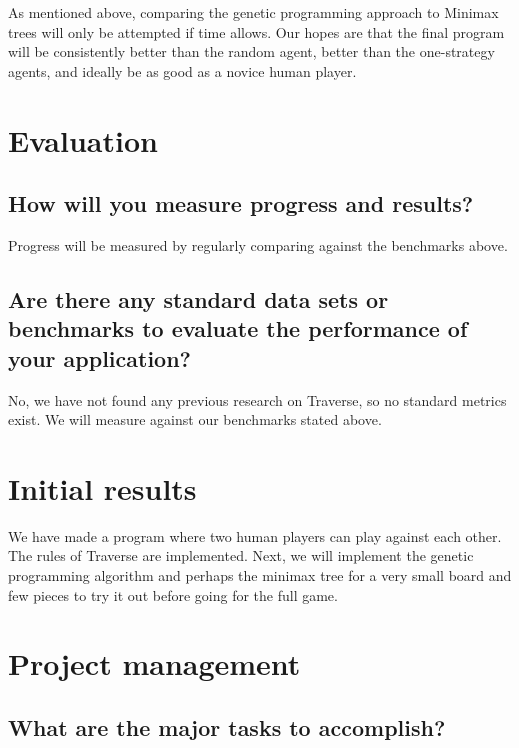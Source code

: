 \documentclass[times, 10pt,twocolumn]{article}
\begin{document}
As mentioned above, comparing the genetic programming approach to Minimax trees will only be attempted if time allows. Our hopes are that the final program will be consistently better than the random agent, better than the one-strategy agents, and ideally be as good as a novice human player.

\section{Evaluation}

\subsection{How will you measure progress and results?}

Progress will be measured by regularly comparing against the benchmarks above.

\subsection{Are there any standard data sets or benchmarks to evaluate the performance of your application?}

No, we have not found any previous research on Traverse, so no standard metrics exist. We will measure against our benchmarks stated above.


\section{Initial results}

We have made a program where two human players can play against each other. The rules of Traverse are implemented. Next, we will implement the genetic programming algorithm and perhaps the minimax tree for a very small board and few pieces to try it out before going for the full game.


\section{Project management}

\subsection{What are the major tasks to accomplish?}
\end{document}
